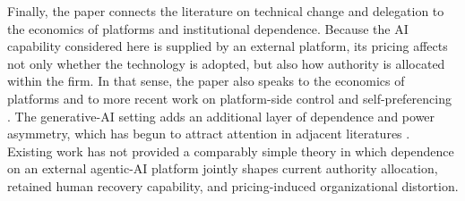 Finally, the paper connects the literature on technical change and delegation to the economics of platforms and institutional dependence. Because the AI capability considered here is supplied by an external platform, its pricing affects not only whether the technology is adopted, but also how authority is allocated within the firm. In that sense, the paper also speaks to the economics of platforms \citep{RochetTirole2003} and to more recent work on platform-side control and self-preferencing \citep{Kim2025}. The generative-AI setting adds an additional layer of dependence and power asymmetry, which has begun to attract attention in adjacent literatures \citep{NzembayieUrbano2026}. Existing work has not provided a comparably simple theory in which dependence on an external agentic-AI platform jointly shapes current authority allocation, retained human recovery capability, and pricing-induced organizational distortion.

